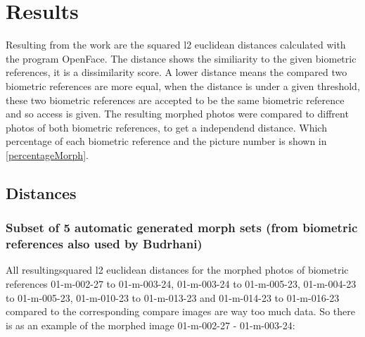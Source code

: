 \section{Results}
\label{Results}
Resulting from the work are the squared l2 euclidean distances calculated with the program OpenFace. The distance shows the similiarity to the given biometric references, it is a dissimilarity score. A lower distance means the compared two biometric references are more equal, when the distance is under a given threshold, these two biometric references are accepted to be the same biometric reference and so access is given. The resulting morphed photos were compared to diffrent photos of both biometric references, to get a independend distance. Which percentage of each biometric reference and the picture number is shown in \ref{percentageMorph}.
\subsection{Distances}

\subsubsection{Subset of 5 automatic generated morph sets (from biometric references also used by Budrhani)}\label{sec:subset5}
All resultingsquared l2 euclidean distances for the morphed photos of biometric references 01-m-002-27 to 01-m-003-24, 01-m-003-24 to 01-m-005-23, 01-m-004-23 to 01-m-005-23, 01-m-010-23 to 01-m-013-23 and 01-m-014-23 to 01-m-016-23 compared to the corresponding compare images are way too much data. So there is as an example of the morphed image 01-m-002-27 - 01-m-003-24:

